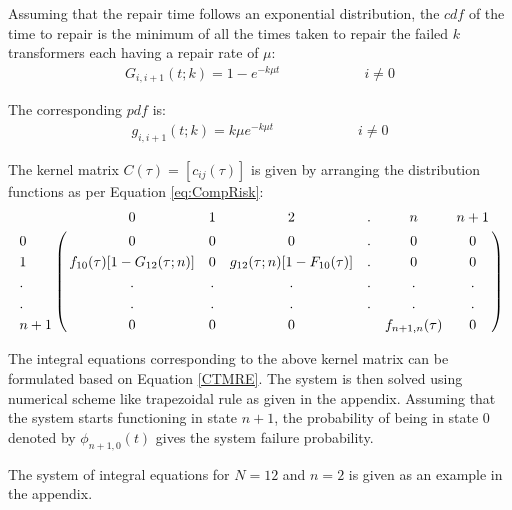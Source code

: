 \documentclass[letterpaper, 12pt]{article}
\begin{document}
Assuming that the repair time follows an exponential distribution, the $cdf$ of the time to repair is the minimum of all the times taken to repair the failed $k$ transformers each having a repair rate of $\mu$:
\begin{align}
G_{i, i+1}(t;k) = 1 - e^{-k\mu t} \hspace{1in} i\neq 0
\label{eqn:ExpSparesCDF}
\end{align}

The corresponding $pdf$ is:
\begin{align}
g_{i,i+1}(t;k) = k\mu e^{-k\mu t}	\hspace{1in} i\neq 0
\label{eqn:ExpSparesPDF}
\end{align}

The kernel matrix $C(\tau) = [c_{ij}(\tau)]$ is given by arranging the distribution functions as per Equation \ref{eq:CompRisk}:
\begin{align*}
\bordermatrix {
	&	0	&	1	&	2	&	.	&	n	&	n+1	\\
0	&	0	&	0	&	0	&	.	&	0	&	0	\\
1	&	f_{10}(\tau)[1-G_{12}(\tau;n)]	&	0	&	g_{12}(\tau;n)[1-F_{10}(\tau)]	&	.	&	0	&	0	\\
.	&	.	&	.	&	.	&	.	&	.	&	.	\\
.	&	.	&	.	&	.	&	.	&	.	&	.	\\
n+1	&	0	&	0	&	0	&		&	f_{n+1,n}(\tau)	&	0	\\
}
\end{align*}

The integral equations corresponding to the above kernel matrix can be formulated based on Equation \ref{CTMRE}. The system is then solved using numerical scheme like trapezoidal rule as given in the appendix. Assuming that the system starts functioning in state $n+1$, the probability of being in state 0 denoted by $\phi_{n+1,0}(t)$ gives the system failure probability.


The system of integral equations for $N=12$ and $n=2$ is given as an example in the appendix.
\end{document}
